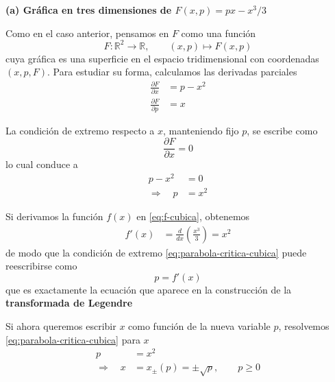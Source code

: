 \documentclass{article}
\begin{document}

\vspace{0.3cm}
\textbf{(a) Gráfica en tres dimensiones de $F(x,p) = px - x^{3}/3$}

Como en el caso anterior, pensamos en \(F\) como una función
\[
F:\mathbb{R}^{2}\longrightarrow\mathbb{R},
\qquad (x,p)\longmapsto F(x,p)
\]
cuya gráfica es una superficie en el espacio tridimensional con coordenadas \((x,p,F)\).
Para estudiar su forma, calculamos las derivadas parciales
\begin{equation}
\begin{split}
\frac{\partial F}{\partial x} &= p - x^{2} \\[4pt]
\frac{\partial F}{\partial p} &= x
\end{split}\label{eq:derivadas-F-cubica}
\end{equation}

La condición de extremo respecto a \(x\), manteniendo fijo \(p\), se escribe como
\[
\frac{\partial F}{\partial x} = 0
\]
lo cual conduce a
\begin{equation}
\begin{split}
p - x^{2} &= 0 \\[4pt]
\Rightarrow\quad p &= x^{2}
\end{split}\label{eq:parabola-critica-cubica}
\end{equation}

Si derivamos la función \(f(x)\) en \eqref{eq:f-cubica}, obtenemos
\begin{equation}
\begin{split}
f'(x) &= \frac{d}{dx}\left(\frac{x^{3}}{3}\right) = x^{2}
\end{split}\label{eq:f-prima-cubica}
\end{equation}
de modo que la condición de extremo \eqref{eq:parabola-critica-cubica} puede
reescribirse como
\[
p = f'(x)
\]
que es exactamente la ecuación que aparece en la construcción de la
\textcolor{trueblue}{\textbf{transformada de Legendre}}

Si ahora queremos escribir \(x\) como función de la nueva variable \(p\), resolvemos
\eqref{eq:parabola-critica-cubica} para \(x\)
\begin{equation}
\begin{split}
p &= x^{2} \\[4pt]
\Rightarrow\quad x &= x_{\pm}(p) = \pm\sqrt{p}, \qquad p \ge 0
\end{split}\label{eq:x-mas-menos-raizp}
\end{equation}
\end{document}
